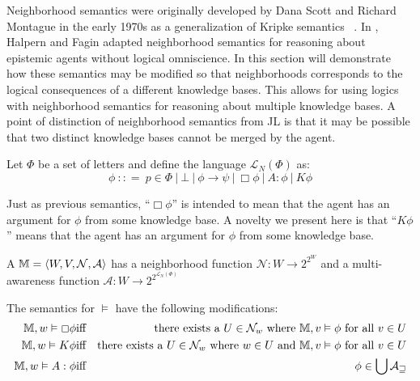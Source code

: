Neighborhood semantics were originally developed by Dana Scott and Richard
Montague in the early 1970s as a generalization of Kripke semantics \
{\cite{montague_universal_2008,scott_advice_1970}}.  In
{\cite{fagin_belief_1988}}, Halpern and Fagin adapted neighborhood semantics
for reasoning about epistemic agents without logical omniscience.  In this
section will demonstrate how these semantics may be modified so that
neighborhoods corresponds to the logical consequences of a different knowledge
bases.  This allows for using logics with neighborhood semantics for
reasoning about multiple knowledge bases.  A point of distinction of
neighborhood semantics from JL is that it may be possible that two distinct
knowledge bases cannot be merged by the agent.

\begin{definition}
  Let $\Phi$ be a set of letters and define the language $\mathcal{L}_N (\Phi)$ as:
  \[ \phi \  : : = \  p \in \Phi \  |
     \  \bot \  | \  \phi \rightarrow \psi
     \  | \  \Box \phi \  | \  A :
     \phi \  | \  K \phi \]
\end{definition}

Just as previous semantics, ``$\Box \phi$'' is intended to mean that the agent
has an argument for $\phi$ from some knowledge base.  A novelty we present
here is that ``$K \phi$'' means that the agent has an argument for $\phi$ from
some \tmtextit{sound} knowledge base.



\begin{definition}
  \label{neighborhoodmodels}A {} $\mathbbm{M}=
  \langle W, V, \mathcal{N}, \mathcal{A} \rangle$ has a neighborhood function
  $\mathcal{N} : W \rightarrow 2^{2^W}$ and a multi-awareness function
  $\mathcal{A} : W \rightarrow 2^{2^{\mathcal{L}_N (\Phi)}}$
  
  
  
  The semantics for $\vDash$ have the following modifications:
  \begin{eqnarray*}
    \mathbbm{M}, w \vDash \Box \phi & \text{iff} & \text{there exists a $U \in
    \mathcal{N}_w$ where $\mathbbm{M}, v \vDash \phi$ for all $v \in U$}\\
    \mathbbm{M}, w \vDash K \phi & \text{iff} & \text{there exists a $U \in
    \mathcal{N}_w$ where $w \in U$ and $\mathbbm{M}, v \vDash \phi$ for all $v
    \in U$}\\
    \mathbbm{M}, w \vDash A : \phi & \text{iff} & \phi \in \bigcup
    \mathcal{A_w}
  \end{eqnarray*}
\end{definition}

